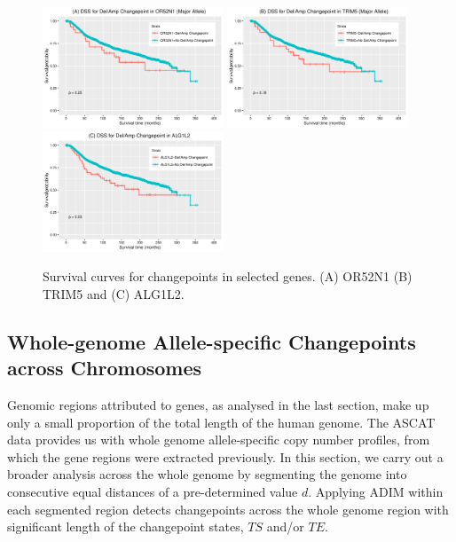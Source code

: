 \begin{figure}[H]
\centering
\includegraphics[width = 0.48\textwidth]{../figures/Chapter_6/survplot_OR52N1.png}
\includegraphics[width = 0.48\textwidth]{../figures/Chapter_6/survplot_TRIM5.png}
\includegraphics[width = 0.48\textwidth]{../figures/Chapter_6/survplot_ALG.png}
\caption[Survival curves for changepoints in selected genes.]{Survival curves for changepoints in selected genes. (A) OR52N1 (B) TRIM5 and (C) ALG1L2.}
\label{fig:TopLength_Genes_Surv}
\end{figure}

\subsection{Whole-genome Allele-specific Changepoints across Chromosomes}
Genomic regions attributed to genes, as analysed in the last section, make up only a small proportion of the total length of the human genome. The ASCAT data provides us with whole genome allele-specific copy number profiles, from which the gene regions were extracted previously. In this section, we carry out a broader analysis across the whole genome by segmenting the genome into consecutive equal distances of a pre-determined value $d$. Applying ADIM within each segmented region detects changepoints across the whole genome region with significant length of the changepoint states, $TS$ and/or $TE$. 

